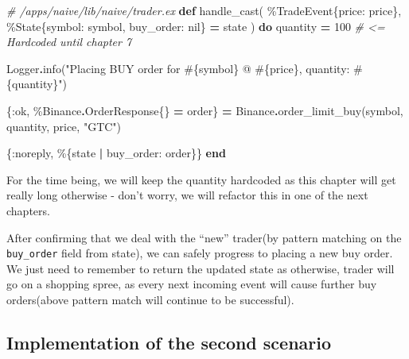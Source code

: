 \documentclass[
  oneside]{book}
\newenvironment{Shaded}{\begin{snugshade}}{\end{snugshade}}
\newcommand{\CommentTok}[1]{\textcolor[rgb]{0.56,0.35,0.01}{\textit{#1}}}
\newcommand{\ConstantTok}[1]{\textcolor[rgb]{0.00,0.00,0.00}{#1}}
\newcommand{\DecValTok}[1]{\textcolor[rgb]{0.00,0.00,0.81}{#1}}
\newcommand{\KeywordTok}[1]{\textcolor[rgb]{0.13,0.29,0.53}{\textbf{#1}}}
\newcommand{\NormalTok}[1]{#1}
\newcommand{\OperatorTok}[1]{\textcolor[rgb]{0.81,0.36,0.00}{\textbf{#1}}}
\newcommand{\OtherTok}[1]{\textcolor[rgb]{0.56,0.35,0.01}{#1}}
\newcommand{\StringTok}[1]{\textcolor[rgb]{0.31,0.60,0.02}{#1}}
\newcommand{\VariableTok}[1]{\textcolor[rgb]{0.00,0.00,0.00}{#1}}
\begin{document}
\begin{Shaded}
\begin{Highlighting}[]
  \CommentTok{\# /apps/naive/lib/naive/trader.ex}
  \KeywordTok{def}\NormalTok{ handle\_cast(}
\NormalTok{        \%}\ConstantTok{TradeEvent}\NormalTok{\{}\VariableTok{price:}\NormalTok{ price\},}
\NormalTok{        \%}\ConstantTok{State}\NormalTok{\{}\VariableTok{symbol:}\NormalTok{ symbol, }\VariableTok{buy\_order:} \ConstantTok{nil}\NormalTok{\} }\OperatorTok{=}\NormalTok{ state}
\NormalTok{      ) }\KeywordTok{do}
\NormalTok{    quantity }\OperatorTok{=} \DecValTok{100} \CommentTok{\# \textless{}= Hardcoded until chapter 7}

    \ConstantTok{Logger}\OperatorTok{.}\NormalTok{info(}\StringTok{"Placing BUY order for }\OtherTok{\#\{}\NormalTok{symbol}\OtherTok{\}}\StringTok{ @ }\OtherTok{\#\{}\NormalTok{price}\OtherTok{\}}\StringTok{, quantity: }\OtherTok{\#\{}\NormalTok{quantity}\OtherTok{\}}\StringTok{"}\NormalTok{)}

\NormalTok{    \{}\VariableTok{:ok}\NormalTok{, \%}\ConstantTok{Binance}\OperatorTok{.}\ConstantTok{OrderResponse}\NormalTok{\{\} }\OperatorTok{=}\NormalTok{ order\} }\OperatorTok{=}
      \ConstantTok{Binance}\OperatorTok{.}\NormalTok{order\_limit\_buy(symbol, quantity, price, }\StringTok{"GTC"}\NormalTok{)}

\NormalTok{    \{}\VariableTok{:noreply}\NormalTok{, \%\{state }\OperatorTok{|} \VariableTok{buy\_order:}\NormalTok{ order\}\}}
  \KeywordTok{end}
\end{Highlighting}
\end{Shaded}

For the time being, we will keep the quantity hardcoded as this chapter will
get really long otherwise - don't worry, we will refactor this in one of the next chapters.

After confirming that we deal with the ``new'' trader(by pattern matching on the \texttt{buy\_order} field from state), we can safely progress to placing a new buy order. We just need to remember to return the updated state as otherwise, trader will go on a shopping spree, as every next incoming event will cause further buy orders(above pattern match will continue to be successful).

\hypertarget{implementation-of-the-second-scenario}{%
\subsection{Implementation of the second scenario}\label{implementation-of-the-second-scenario}}
\end{document}
